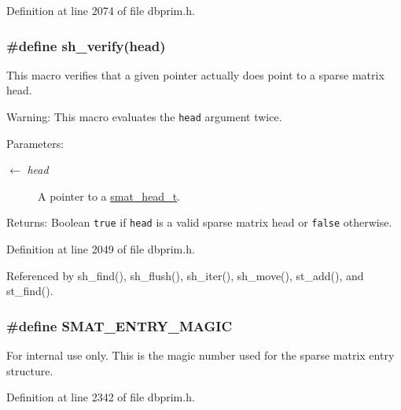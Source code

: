 Definition at line 2074 of file dbprim.h.\hypertarget{group__dbprim__smat_ga43}{
\subsubsection[sh\_\-verify]{\setlength{\rightskip}{0pt plus 5cm}\#define sh\_\-verify(head)}}
\label{group__dbprim__smat_ga43}


This macro verifies that a given pointer actually does point to a sparse matrix head.

\begin{Desc}
\item[Warning:]This macro evaluates the {\tt head} argument twice.\end{Desc}
\begin{Desc}
\item[Parameters:]
\begin{description}
\item[\mbox{$\leftarrow$} {\em head}]A pointer to a \hyperlink{group__dbprim__smat_ga1}{smat\_\-head\_\-t}.\end{description}
\end{Desc}
\begin{Desc}
\item[Returns:]Boolean {\tt true} if {\tt head} is a valid sparse matrix head or {\tt false} otherwise.\end{Desc}


Definition at line 2049 of file dbprim.h.

Referenced by sh\_\-find(), sh\_\-flush(), sh\_\-iter(), sh\_\-move(), st\_\-add(), and st\_\-find().\hypertarget{group__dbprim__smat_ga54}{
\subsubsection[SMAT\_\-ENTRY\_\-MAGIC]{\setlength{\rightskip}{0pt plus 5cm}\#define SMAT\_\-ENTRY\_\-MAGIC}}
\label{group__dbprim__smat_ga54}


\begin{Desc}
\item[For internal use only.]
This is the magic number used for the sparse matrix entry structure.\end{Desc}


Definition at line 2342 of file dbprim.h.


